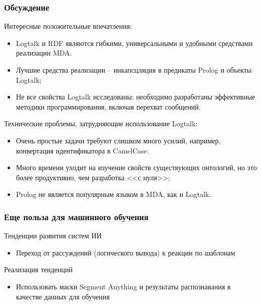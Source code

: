 \documentclass[10pt]{beamer}
\begin{document}
\begin{frame}
  \frametitle{Обсуждение}
Интересные положительные впечатления:
\begin{itemize}
\item Logtalk и RDF являются гибкими, универсальными и удобными средствами реализации MDA.
\item Лучшие средства реализации -- инкапсцляция в предикаты Prolog и объекты Logtalk;
\item Не все свойства Logtalk исследованы: необходимо разработаны эффективные методики программирования, включая перехват сообщений.
\end{itemize}
Технические проблемы, затрудняющие использование Logtalk:
\begin{itemize}
\item Очень простые задачи требуют слишком много усилий, например, конвертация идентификатора в CamelCase.
\item Много времени уходит на изучение свойств существующих онтологий, но это более продуктивно, чем разработка <<с нуля>>;
\item Prolog не является популярным языком в MDA, как и Logtalk.
\end{itemize}
\end{frame}

\begin{frame}
  \frametitle{Еще польза для машинного обучения}
  Тенденции развития систем ИИ
  \begin{itemize}
  \item Переход от рассуждений (логического вывода) к реакции по шаблонам
  \end{itemize}
  Реализация тенденций
  \begin{itemize}
  \item Использовать маски Segment Anything и результаты распознавания в качестве данных для обучения
  \end{itemize}
\end{frame}
\end{document}
